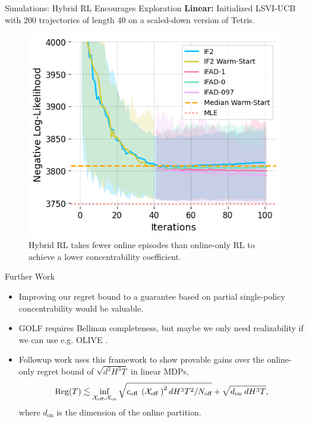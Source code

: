 \documentclass[final]{beamer}
\newcommand{\on}{\operatorname{on}}
\newlength{\colwidth}
\begin{document}
\begin{frame}[t]
\begin{columns}[t]
\begin{column}{\colwidth}
\begin{exampleblock}{Simulations: Hybrid RL Encourages Exploration}
    \textbf{Linear:} Initialized LSVI-UCB \cite{jin2020provably} with $200$ trajectories of length $40$ on a scaled-down version of Tetris.

    \begin{figure}[H]
    \centering
    \includegraphics[scale=1]{imgs/095/optim.png}
    \caption{Hybrid RL takes fewer online episodes than online-only RL to achieve a lower concentrability coefficient.}
    \label{fig:linear-coverage}
\end{figure}


    
  \end{exampleblock}

\begin{block}{Further Work}
    \begin{itemize}
        \item Improving our regret bound to a guarantee based on partial single-policy concentrability would be valuable.
        \item GOLF requires Bellman completeness, but maybe we only need realizability if we can use e.g. OLIVE \cite{du2021bilinear}.
        \item Followup work \cite{tan2024hybridreinforcementlearningbreaks} uses this framework to show provable gains over the online-only regret bound of $\sqrt{d^2H^3T}$ in linear MDPs, 
        $$\text{Reg}(T) \lesssim \inf _{\mathcal{X}_{\text {off}}, \mathcal{X}_{\text {on}}} \sqrt{c_{\text {off }}\left(\mathcal{X}_{\text {off }}\right)^2 d H^3 T^2 / N_{\text {off}}}+\sqrt{d_{\text {on }} d H^3 T},
        \vspace{-0.5ex}$$
        where $d_{\on}$ is the dimension of the online partition.
    \end{itemize}
\end{block}
\vspace{-2ex}
  

\end{column}
\end{columns}
\end{frame}
\end{document}
